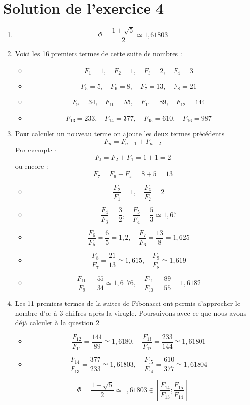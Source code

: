 \documentclass[a4paper,11pt]{book}
\begin{document}
\clearpage

\section{Solution de l'exercice 4}
\label{sec:orgc506e60}
\label{orgea731a5}
\label{page:sec8.2.2sol4}


\begin{enumerate}
\item \[\Phi = \dfrac{1 + \sqrt{5}}{2} \simeq 1,61803\]
\item Voici les 16 premiers termes de cette suite de nombres :
\begin{itemize}
\item \[F_1 = 1,\quad F_2 = 1,\quad F_3 = 2,\quad F_4 = 3\]
\item \[F_5 = 5,\quad F_6 = 8,\quad F_7 = 13,\quad F_8 = 21\]
\item \[F_9 = 34,\quad F_{10} = 55,\quad F_{11} = 89,\quad F_{12} = 144\]
\item \[F_{13} = 233,\quad F_{14} = 377,\quad F_{15} = 610,\quad F_{16} = 987\]
\end{itemize}
\item Pour calculer un nouveau terme on ajoute les deux termes précédents
\[F_n = F_{n - 1} + F_{n-2}\]
Par exemple :
\[F_3 = F_2 + F_1 = 1 + 1 = 2\]
ou encore :
\[F_7 = F_6 + F_5 = 8 + 5 = 13\]
\begin{itemize}
\item \[\dfrac{F_2}{F_1} = 1,\quad \dfrac{F_3}{F_2} = 2\]
\item \[\dfrac{F_4}{F_3} = \dfrac{3}{2},\quad \dfrac{F_5}{F_4} = \dfrac{5}{3}\simeq 1,67\]
\item \[\dfrac{F_6}{F_5} = \dfrac{6}{5} = 1,2,\quad\dfrac{F_7}{F_6} = \dfrac{13}{8} = 1,625\]
\item \[\dfrac{F_8}{F_7} = \dfrac{21}{13}\simeq 1,615,\quad\dfrac{F_9}{F_8}\simeq 1,619\]
\item \[\dfrac{F_{10}}{F_9} = \dfrac{55}{34}\simeq 1,6176,\quad\dfrac{F_{11}}{F_{10}} = \dfrac{89}{55} = 1,6182\]
\end{itemize}
\item Les 11 premiers termes de la suites de Fibonacci ont permis
d'approcher le nombre d'or à 3 chiffres après la
virugle. Poursuivons avec ce que nous avons déjà calculer à la question 2.
\begin{itemize}
\item \[\dfrac{F_{12}}{F_{11}} = \dfrac{144}{89}\simeq 1,6180,\quad\dfrac{F_{13}}{F_{12}} = \dfrac{233}{144}\simeq 1,61801\]
\item \[\dfrac{F_{14}}{F_{13}} = \dfrac{377}{233}\simeq 1,61803,\quad\dfrac{F_{15}}{F_{14}} = \dfrac{610}{377}\simeq 1,61804\]
\end{itemize}
\[\Phi = \dfrac{1 + \sqrt{5}}{2} \simeq 1,61803\in
   \left[\dfrac{F_{14}}{F_{13}} ; \dfrac{F_{15}}{F_{14}}\right]\]
\end{enumerate}
\end{document}
